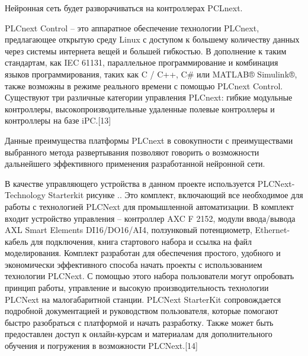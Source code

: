 {\gostFont

	\par \redline Нейронная сеть будет разворачиваться на контроллерах PCLnext.

	\par \redline PLCnext Control {--} это аппаратное обеспечение технологии PLCnext, предлагающее открытую среду Linux с доступом к большему количеству данных через системы интернета вещей и большей гибкостью. В дополнение к таким стандартам, как IEC 61131, параллельное программирование и комбинация языков программирования, таких как C / C++, C\# или MATLAB® Simulink®, также возможны в режиме реального времени с помощью PLCnext Control. Существуют три различные категории управления PLCnext: гибкие модульные контроллеры, высокопроизводительные удаленные полевые контроллеры и контроллеры на базе iPC.[13]

	\par \redline Данные преимущества платформы PLCnext в совокупности с преимуществами выбранного метода развертывания позволяют говорить о возможности дальнейшего эффективного применения разработанной нейронной сети.

	\par \redline В качестве управляющего устройства в данном проекте используется PLCNext-Technology Starterkit  рисунке \thechaptercntr.\theimagecntr. Это комплект, включающий все необходимое для работы с технологией PLCNext для промышленной автоматизации. В комплект входит устройство управления {--} контроллер AXC F 2152, модули ввода/вывода AXL Smart Elements DI16/DO16/AI4, ползунковый потенциометр, Ethernet-кабель для подключения, книга стартового набора и ссылка на файл моделирования. Комплект разработан для обеспечения простого, удобного и экономически эффективного способа начать проекты с использованием технологии PLCNext. С помощью этого набора пользователи могут опробовать принцип работы, управление и высокую производительность технологии PLCNext на малогабаритной станции. PLCNext StarterKit сопровождается подробной документацией и руководством пользователя, которые помогают быстро разобраться с платформой и начать разработку. Также может быть предоставлен доступ к онлайн-курсам и материалам для дополнительного обучения и погружения в возможности PLCNext.[14]

}
